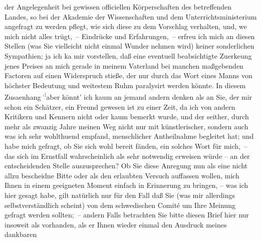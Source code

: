 \begin{ledgroupsized}[t]{13cm}
                    der Angelegenheit bei gewissen officiellen Körperschaften des betreffenden
                    Landes, so bei der Akademie der Wissenschaften
                    und dem Unterrichtsministerium angefragt zu
                    werden pflegt, wie sich diese zu dem {\pb}Vorschlag verhalten, und, we{\geminationn} mich nicht alles
                    trügt, – Eindrücke und Erfahrungen, – erfreu ich mich an diesen Stellen (was Sie
                    vielleicht nicht einmal Wunder nehmen wird) keiner sonderlichen Sympathien; ja
                    ich ka{\geminationn} mir vorstellen, daß eine eventuell
                    beabsichtigte Zuerke{\geminationn}ung jenes Preises an mich
                    gerade in meinem Vaterland bei manchen maßgebenden Factoren auf einen
                    Widerspruch stieße, der nur durch das Wort eines Manns von höchster Bedeutung
                    und weitestem Ruhm paralysirt werden könnte. In diesem Zusa{\geminationm}enhang \substVorne{}\textsuperscript{\textcolor{gray}{d}}\substDazwischen{}a\substHinten{}ber könnt’ ich kaum an jemand andern denken als an Sie, der mir schon
                    ein Schätzer, ein {\pb}Freund gewesen ist zu
                    einer Zeit, da ich von andern Kritikern und Kennern nicht oder kaum bemerkt
                    wurde, und der seither, durch mehr als zwanzig Jahre meinen Weg nicht nur mit
                    künstlerischer, sondern \introOben{}auch\introOben{} was ich sehr wohlthuend
                    empfand, menschlicher Antheilnahme begleitet hat; und habe mich gefragt, ob Sie
                    sich wohl bereit fänden, ein solches Wort für mich, – das sich im Ernstfall
                    wahrscheinlich als sehr notwendig erweisen würde – an der entscheidenden Stelle
                    auszusprechen? Ob Sie \introOben{}\introOben{} diese Anregung nun als eine nicht allzu bescheidne Bitte oder als den
                    erlaubten Versuch auffassen wollen, mich Ihnen in einem geeigneten Moment
                    einfach in Erinnerung zu bringen, {\pb}– was ich
                    hier gesagt habe, gilt natürlich nur für den Fall daß Sie (was mir allerdings
                    selbstverständlich scheint) von dem schwedischen Comité um Ihre Meinung gefragt
                    werden sollten; – andern Falls betrachten Sie bitte diesen Brief hier nur
                    insoweit als vorhanden, als er Ihnen wieder einmal den Ausdruck meines dankbaren

\end{ledgroupsized}
